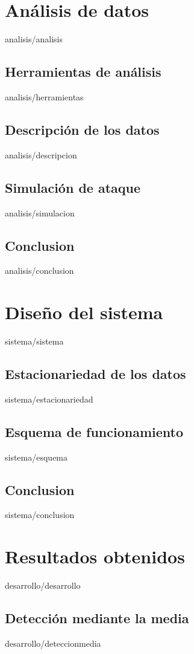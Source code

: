 \documentclass[epsbased,copyright,final,printable,covers,extendedindex,firstnumbered,tfg,gnuplot]{tfgtfmthesisuam}
\begin{document}
\chapter{Análisis de datos\label{CAP:ANALISIS}}{analisis/analisis}
  \section{Herramientas de análisis\label{SEC:HERRAMIENTAS}}{analisis/herramientas}
  \section{Descripción de los datos\label{SEC:DESCRIPCION}}{analisis/descripcion}
  \section{Simulación de ataque\label{SEC:SIMULACION}}{analisis/simulacion}
  \section{Conclusion\label{SEC:ADCONCLUSION}}{analisis/conclusion}

\chapter{Diseño del sistema\label{CAP:SISTEMA}}{sistema/sistema}
  \section{Estacionariedad de los datos\label{SEC:ESTACIONARIEDAD}}{sistema/estacionariedad}
  \section{Esquema de funcionamiento\label{SEC:ESQUEMA}}{sistema/esquema}
  \section{Conclusion\label{SEC:SDCONCLUSION}}{sistema/conclusion}

\chapter{Resultados obtenidos\label{CAP:DESARROLLO}}{desarrollo/desarrollo}
  \section{Detección mediante la media\label{SEC:DETECCIONMEDIA}}{desarrollo/deteccionmedia}
\end{document}
